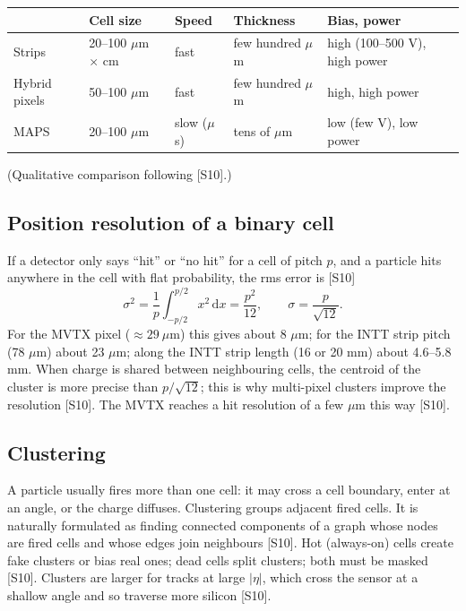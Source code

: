\documentclass[11pt,letterpaper]{article}
\begin{document}
\begin{center}\small
\begin{tabularx}{\linewidth}{@{}lXXXX@{}}\toprule
 & Cell size & Speed & Thickness & Bias, power\\\midrule
Strips & 20--100 $\mu$m $\times$ cm & fast & few hundred $\mu$m & high (100--500 V), high power\\
Hybrid pixels & 50--100 $\mu$m & fast & few hundred $\mu$m & high, high power\\
MAPS & 20--100 $\mu$m & slow ($\mu$s) & tens of $\mu$m & low (few V), low power\\\bottomrule
\end{tabularx}\end{center}
(Qualitative comparison following [S10].)

\subsection{Position resolution of a binary cell}
If a detector only says ``hit'' or ``no hit'' for a cell of pitch $p$, and a particle hits anywhere in the cell with flat probability, the rms error is [S10]
\begin{equation}
\sigma^2=\frac1p\int_{-p/2}^{p/2}x^2\,\mathrm{d}x=\frac{p^2}{12},\qquad\sigma=\frac{p}{\sqrt{12}}.
\end{equation}
For the MVTX pixel ($\approx29\ \mu$m) this gives about 8 $\mu$m; for the INTT strip pitch (78 $\mu$m) about 23 $\mu$m; along the INTT strip length (16 or 20 mm) about 4.6--5.8 mm.
When charge is shared between neighbouring cells, the centroid of the cluster is more precise than $p/\sqrt{12}$; this is why multi-pixel clusters improve the resolution [S10]. The MVTX reaches a hit resolution of a few $\mu$m this way [S10].

\subsection{Clustering}
A particle usually fires more than one cell: it may cross a cell boundary, enter at an angle, or the charge diffuses.
Clustering groups adjacent fired cells.
It is naturally formulated as finding connected components of a graph whose nodes are fired cells and whose edges join neighbours [S10].
Hot (always-on) cells create fake clusters or bias real ones; dead cells split clusters; both must be masked [S10].
Clusters are larger for tracks at large $|\eta|$, which cross the sensor at a shallow angle and so traverse more silicon [S10].
\end{document}
